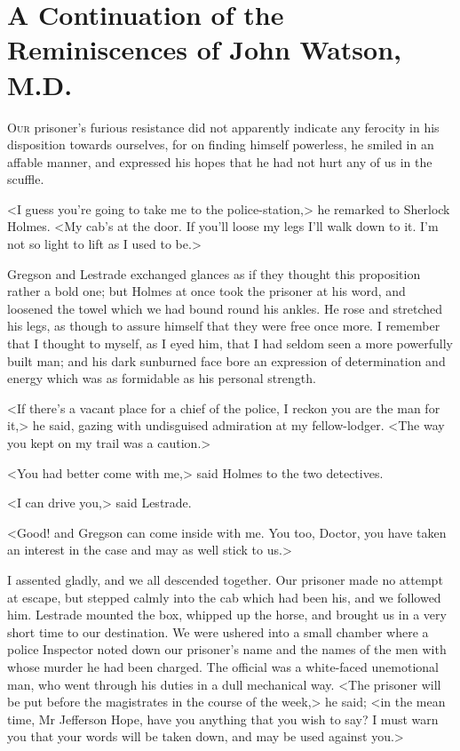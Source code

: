 \chapter{A Continuation of the Reminiscences of John Watson, M.D.}
	\lettrine{O}{ur} prisoner's furious resistance did not apparently indicate any ferocity in his disposition towards ourselves, for on finding himself powerless, he smiled in an affable manner, and expressed his hopes that he had not hurt any of us in the scuffle. 
	
	\zz
	<I guess you're going to take me to the police-station,> he remarked to Sherlock Holmes. <My cab's at the door. If you'll loose my legs I'll walk down to it. I'm not so light to lift as I used to be.>

Gregson and Lestrade exchanged glances as if they thought this proposition rather a bold one; but Holmes at once took the prisoner at his word, and loosened the towel which we had bound round his ankles. He rose and stretched his legs, as though to assure himself that they were free once more. I remember that I thought to myself, as I eyed him, that I had seldom seen a more powerfully built man; and his dark sunburned face bore an expression of determination and energy which was as formidable as his personal strength.

<If there's a vacant place for a chief of the police, I reckon you are the man for it,> he said, gazing with undisguised admiration at my fellow-lodger. <The way you kept on my trail was a caution.>

<You had better come with me,> said Holmes to the two detectives.

<I can drive you,> said Lestrade.

<Good! and Gregson can come inside with me. You too, Doctor, you have taken an interest in the case and may as well stick to us.>

I assented gladly, and we all descended together. Our prisoner made no attempt at escape, but stepped calmly into the cab which had been his, and we followed him. Lestrade mounted the box, whipped up the horse, and brought us in a very short time to our destination. We were ushered into a small chamber where a police Inspector noted down our prisoner's name and the names of the men with whose murder he had been charged. The official was a white-faced unemotional man, who went through his duties in a dull mechanical way. <The prisoner will be put before the magistrates in the course of the week,> he said; <in the mean time, Mr Jefferson Hope, have you anything that you wish to say? I must warn you that your words will be taken down, and may be used against you.>

